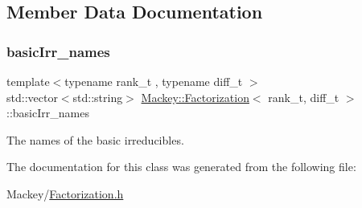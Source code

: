 \subsection{Member Data Documentation}
\mbox{\label{classMackey_1_1Factorization_aafee5aadae0d83b75741e0e8c2955625}} 
\subsubsection{\texorpdfstring{basic\+Irr\+\_\+names}{basicIrr\_names}}
{\footnotesize\ttfamily template$<$typename rank\+\_\+t , typename diff\+\_\+t $>$ \\
std\+::vector$<$std\+::string$>$ \hyperlink{classMackey_1_1Factorization}{Mackey\+::\+Factorization}$<$ rank\+\_\+t, diff\+\_\+t $>$\+::basic\+Irr\+\_\+names}



The names of the basic irreducibles. 



The documentation for this class was generated from the following file\+:\begin{DoxyCompactItemize}
\item 
Mackey/\hyperlink{Factorization_8h}{Factorization.\+h}\end{DoxyCompactItemize}
